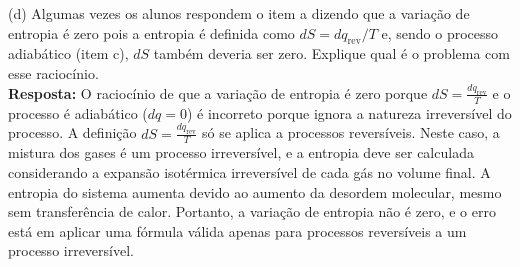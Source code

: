(d) Algumas vezes os alunos respondem o item a dizendo que a variação de
entropia é zero pois a entropia é definida como \(dS= dq_{\text{rev}}/T\) e,
sendo o processo adiabático (item c), \(dS\) também deveria ser zero. Explique
qual é o problema com esse raciocínio.\\

    \textbf{Resposta:} O raciocínio de que a variação de entropia é zero porque 
    \(dS = \frac{dq_{\text{rev}}}{T}\) e o processo é adiabático (\(dq = 0\)) é 
    incorreto porque ignora a natureza irreversível do processo. A definição 
    \(dS = \frac{dq_{\text{rev}}}{T}\) só se aplica a processos reversíveis. 
    Neste caso, a mistura dos gases é um processo irreversível, e a entropia deve 
    ser calculada considerando a expansão isotérmica irreversível de cada gás no 
    volume final. A entropia do sistema aumenta devido ao aumento da desordem 
    molecular, mesmo sem transferência de calor. Portanto, a variação de entropia 
    não é zero, e o erro está em aplicar uma fórmula válida apenas para processos 
    reversíveis a um processo irreversível.\\

